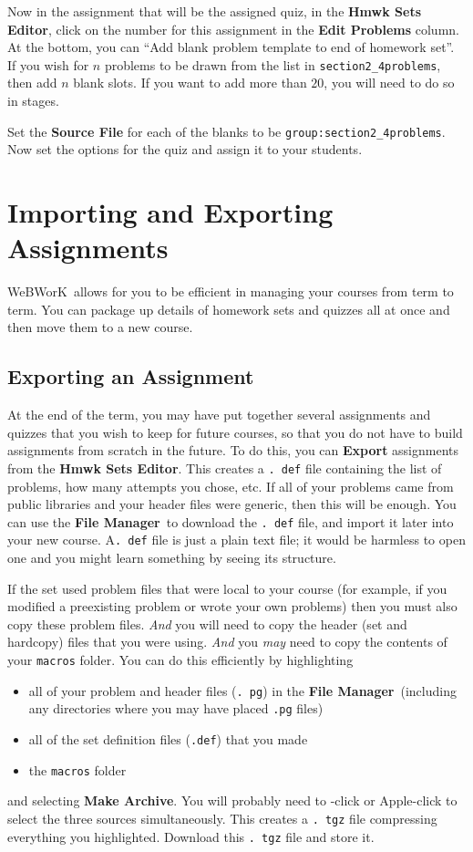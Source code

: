 \documentclass[12pt]{article}
\newcommand{\menu}[1]{\textbf{#1}}
\newcommand{\WW}{WeBWorK}
\newcommand{\HSE}{\menu{Hmwk Sets Editor}}
\newcommand{\FM}{\menu{File Manager}}
\begin{document}
Now in the assignment that will be the assigned quiz, in the \HSE, click on the number for this assignment in the {\bf Edit Problems} column.
At the bottom, you can ``Add blank problem template to end of homework set''.
If you wish for $n$ problems to be drawn from the list in \texttt{section2\_4problems}, then add $n$ blank slots.
If you want to add more than $20$, you will need to do so in stages.

Set the {\bf Source File} for each of the blanks to be \texttt{group:section2\_4problems}.
Now set the options for the quiz and assign it to your students.

\section{Importing and Exporting Assignments}\label{impexp}
\WW\ allows for you to be efficient in managing your courses from term to term.
You can package up details of homework sets and quizzes all at once and then move them to a new course.

\subsection{Exporting an Assignment}\label{exp}
At the end of the term, you may have put together several assignments and quizzes that you wish to keep for future courses, so that you do not have to build assignments from scratch in the future.
To do this, you can \menu{Export} assignments from the \HSE.
This creates a \texttt{.
	def} file containing the list of problems, how many attempts you chose, etc.
If all of your problems came from public libraries and your header files were generic, then this will be enough.
You can use the \FM\  to download the \texttt{.
	def} file, and import it later into your new course.
A\texttt{.
	def} file is just a plain text file; it would be harmless to open one and you might learn something by seeing its structure.

If the set used problem files that were local to your course (for example, if you modified a preexisting problem or wrote your own problems) then you must also copy these problem files.
\emph{And} you will need to copy the header (set and hardcopy) files that you were using.  \emph{And} you \emph{may} need to copy the contents of your \texttt{macros} folder.
You can do this efficiently by highlighting \begin{itemize} \item all of your problem and header files (\texttt{.
		      pg}) in the \FM\  (including any directories where you may have placed \texttt{.pg} files)
	\item all of the set definition files (\texttt{.def}) that you made
	\item the \texttt{macros} folder
\end{itemize}
and selecting \menu{Make Archive}.
You will probably need to \Ctrl-click or Apple-click to select the three sources simultaneously.
This creates a \texttt{.
	tgz} file compressing everything you highlighted.
Download this \texttt{.
	tgz} file and store it.
\end{document}
